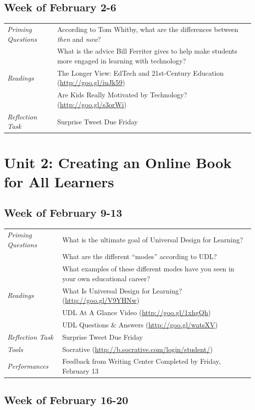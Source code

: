 \documentclass{tufte-handout}
\newcommand{\tabpq}{\faQuestionSign\medspace\textit{Priming Questions}}
\newcommand{\tabread}{\faBook\medspace\textit{Readings}}
\newcommand{\tabtools}{\faWrench\medspace\textit{Tools}}
\newcommand{\tabtweet}{\faLightbulb\medspace\textit{Reflection Task} & Surprise Tweet Due Friday \\}
\newcommand{\tabperformance}{\faTasks\medspace\textit{Performances}}
\newenvironment{tabsched}
	{\small
	\begin{tabular}{p{1.5in}p{5in}}
	\toprule}
	{\bottomrule
	\end{tabular}
	\normalsize}
\begin{document}
\begin{fullwidth}
\subsection{Week of February 2-6}

\begin{tabsched}
	\tabpq & According to Tom Whitby, what are the differences between \textit{then} and \textit{now}? \\
	& What is the advice Bill Ferriter gives to help make students more engaged in learning with technology? \\
	\midrule
	\tabread & The Longer View: EdTech and 21st-Century Education (\url{http://goo.gl/iuJk59}) \\
	& Are Kids Really Motivated by Technology? (\url{http://goo.gl/s3orWi}) \\
	\midrule
	\tabtweet
\end{tabsched}

\section{Unit 2: Creating an Online Book for All Learners}

\subsection{Week of February 9-13}

\begin{tabsched}
	\tabpq & What is the ultimate goal of Universal Design for Learning? \\
	& What are the different \enquote{modes} according to UDL? \\
	& What examples of these different modes have you seen in your own educational career? \\
	\midrule
	\tabread & What Is Universal Design for Learning? (\url{http://goo.gl/V9YHNw}) \\
	& UDL At A Glance Video (\url{http://goo.gl/1xhgQh}) \\
	& UDL Questions \& Answers (\url{http://goo.gl/watsXV}) \\
	\midrule
	\tabtweet
	\midrule
	\tabtools & Socrative (\url{http://b.socrative.com/login/student/}) \\
	\midrule
	\tabperformance & Feedback from Writing Center Completed by Friday, February 13 \\
\end{tabsched}
\newpage
\subsection{Week of February 16-20}


\end{fullwidth}
\end{document}
